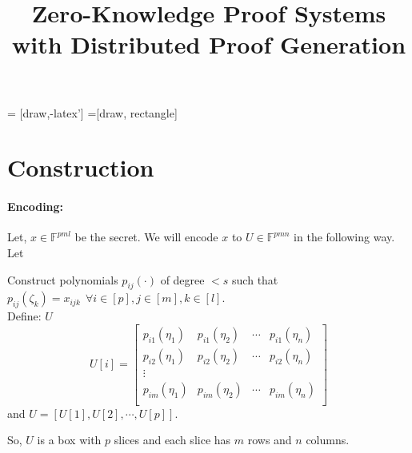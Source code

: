 \documentclass[runningheads]{llncs}
\title{Zero-Knowledge Proof Systems with Distributed Proof Generation}
\begin{document}
 = [draw,-latex']
=[draw, rectangle]
\maketitle






\section{Construction}




\paragraph{Encoding:}
Let, $x\in \mathbb{F}^{pml}$ %
be the secret. We will encode $x$ to $U\in \mathbb{F}^{pmn}$ in the following way.\\
Let


Construct polynomials $p_{ij}(\cdot)$ %
of degree $< s$ such that 
$ p_{ij}(\zeta_k)=x_{ijk} ~~\forall i\in [p], j\in [m], k\in [l]$.\\
Define:  $U$ %
$$U[i]=
\begin{bmatrix}
	p_{i1}(\eta_1) & p_{i1}(\eta_2) & \cdots & p_{i1}(\eta_n)\\
	p_{i2}(\eta_1) & p_{i2}(\eta_2) & \cdots & p_{i2}(\eta_n)\\
	\vdots\\
	p_{im}(\eta_1) & p_{im}(\eta_2) & \cdots & p_{im}(\eta_n)\\
\end{bmatrix}
$$
and $U=[U[1], U[2], \cdots, U[p]]$.

So, $U$ is a box with $p$ slices and each slice has $m$ rows and $n$ columns.
\end{document}

